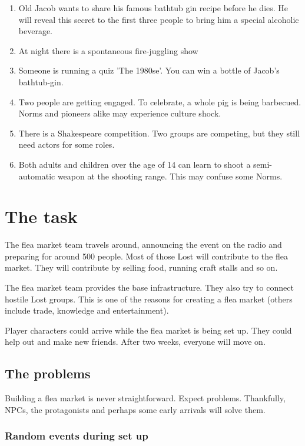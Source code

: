 \begin{enumerate}
    \item Old Jacob wants to share his famous bathtub gin recipe before he dies. He will reveal this secret to the first three people to bring him a special alcoholic beverage.
    \item At night there is a spontaneous fire-juggling show
    \item Someone is running a quiz 'The 1980se'. You can win a bottle of Jacob's bathtub-gin.
    \item Two people are getting engaged. To celebrate, a whole pig is being barbecued. Norms and pioneers alike may experience culture shock.
    \item There is a Shakespeare competition. Two groups are competing, but they still need actors for some roles.
    \item Both adults and children over the age of 14 can learn to shoot a semi-automatic weapon at the shooting range. This may confuse some Norms.
\end{enumerate}


\chapter{The task}

The flea market team travels around, announcing the event on the radio and preparing for around 500 people. Most of those Lost will contribute to the flea market. They will contribute by selling food, running craft stalls and so on.

The flea market team provides the base infrastructure. They also try to connect hostile Lost groups. This is one of the reasons for creating a flea market (others include trade, knowledge and entertainment).

Player characters could arrive while the flea market is being set up. They could help out and make new friends. After two weeks, everyone will move on.

\section{The problems}

Building a flea market is never straightforward. Expect problems. Thankfully, NPCs, the protagonists and perhaps some early arrivals will solve them.

\subsection{Random events during set up}

